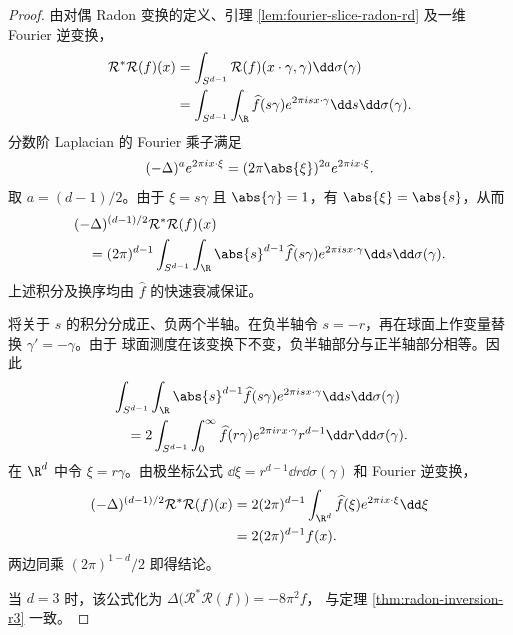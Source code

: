 \begin{proof}
	由对偶 Radon 变换的定义、引理
	\ref{lem:fourier-slice-radon-rd} 及一维 Fourier 逆变换，
	\[
	\begin{aligned}
	\mathcal R^*\mathcal R(f)(x)
	&=\int_{S^{d-1}}\mathcal R(f)(x\cdot\gamma,\gamma)
	\dd\sigma(\gamma)\\
	&=\int_{S^{d-1}}\int_{\R}
	\widehat f(s\gamma)e^{2\pi isx\cdot\gamma}
	\dd s\dd\sigma(\gamma).
	\end{aligned}
	\]
	分数阶 Laplacian 的 Fourier 乘子满足
	\[
	(-\Delta)^a e^{2\pi ix\cdot\xi}
	=(2\pi\abs{\xi})^{2a}e^{2\pi ix\cdot\xi}.
	\]
	取 $a=(d-1)/2$。由于 $\xi=s\gamma$ 且
	$\abs{\gamma}=1$，有 $\abs{\xi}=\abs{s}$，从而
	\[
	\begin{aligned}
	&(-\Delta)^{(d-1)/2}\mathcal R^*\mathcal R(f)(x)\\
	&\quad=(2\pi)^{d-1}
	\int_{S^{d-1}}\int_{\R}
	\abs{s}^{d-1}\widehat f(s\gamma)
	e^{2\pi isx\cdot\gamma}
	\dd s\dd\sigma(\gamma).
	\end{aligned}
	\]
	上述积分及换序均由 $\widehat f$ 的快速衰减保证。

	将关于 $s$ 的积分分成正、负两个半轴。在负半轴令
	$s=-r$，再在球面上作变量替换 $\gamma'=-\gamma$。由于
	球面测度在该变换下不变，负半轴部分与正半轴部分相等。因此
	\[
	\begin{aligned}
	&\int_{S^{d-1}}\int_{\R}
	\abs{s}^{d-1}\widehat f(s\gamma)
	e^{2\pi isx\cdot\gamma}\dd s\dd\sigma(\gamma)\\
	&\quad=2\int_{S^{d-1}}\int_0^\infty
	\widehat f(r\gamma)e^{2\pi irx\cdot\gamma}
	r^{d-1}\dd r\dd\sigma(\gamma).
	\end{aligned}
	\]
	在 $\R^d$ 中令 $\xi=r\gamma$。由极坐标公式
	$\dd\xi=r^{d-1}\dd r\dd\sigma(\gamma)$ 和 Fourier 逆变换，
	\[
	\begin{aligned}
	(-\Delta)^{(d-1)/2}\mathcal R^*\mathcal R(f)(x)
	&=2(2\pi)^{d-1}
	\int_{\R^d}\widehat f(\xi)e^{2\pi ix\cdot\xi}\dd\xi\\
	&=2(2\pi)^{d-1}f(x).
	\end{aligned}
	\]
	两边同乘 $(2\pi)^{1-d}/2$ 即得结论。

	当 $d=3$ 时，该公式化为
	$\Delta\bigl(\mathcal R^*\mathcal R(f)\bigr)=-8\pi^2f$，
	与定理 \ref{thm:radon-inversion-r3} 一致。
\end{proof}
